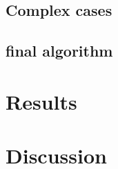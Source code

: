 \documentclass[two column]{article}
\begin{document}
\subsection{Complex cases}


\subsection{final algorithm}

\section{Results}

\section{Discussion}
\end{document}
